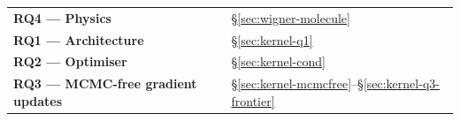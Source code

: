\begin{center}\small
\begin{tabular}{@{}ll@{}}
\toprule
\textbf{RQ4 --- Physics} & \S\ref{sec:wigner-molecule} \\
\textbf{RQ1 --- Architecture} & \S\ref{sec:kernel-q1} \\
\textbf{RQ2 --- Optimiser} & \S\ref{sec:kernel-cond} \\
\textbf{RQ3 --- MCMC-free gradient updates} & \S\ref{sec:kernel-mcmcfree}--\S\ref{sec:kernel-q3-frontier} \\
\bottomrule
\end{tabular}
\end{center}

\clearpage
